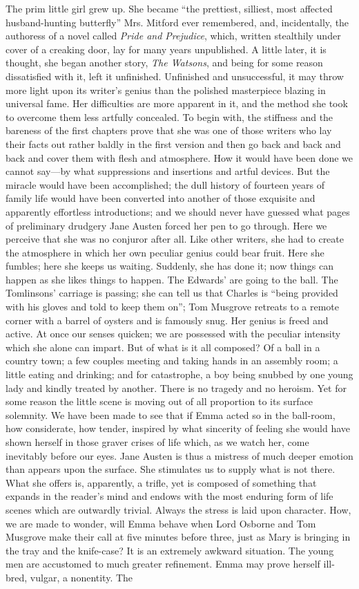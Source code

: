 The prim little girl grew up. She became ``the prettiest, silliest, most affected husband-hunting butterfly'' Mrs. Mitford ever remembered, and, incidentally, the authoress of a novel called \textit{Pride and Prejudice}, which, written stealthily under cover of a creaking door, lay for many years unpublished. A little later, it is thought, she began another story, \textit{The Watsons}, and being for some reason dissatisfied with it, left it unfinished. Unfinished and unsuccessful, it may throw more light upon its writer's genius than the polished masterpiece blazing in universal fame. Her difficulties are more apparent in it, and the method she took to overcome them less artfully concealed. To begin with, the stiffness and the bareness of the first chapters prove that she was one of those writers who lay their facts out rather baldly in the first version and then go back and back and back and cover them with flesh and atmosphere. How it would have been done we cannot say—by what suppressions and insertions and artful devices. But the miracle would have been accomplished; the dull history of fourteen years of family life would have been converted into another of those exquisite and apparently effortless introductions; and we should never have guessed what pages of preliminary drudgery Jane Austen forced her pen to go through. Here we perceive that she was no conjuror after all. Like other writers, she had to create the atmosphere in which her own peculiar genius could bear fruit. Here she fumbles; here she keeps us waiting. Suddenly, she has done it; now things can happen as she likes things to happen. The Edwards' are going to the ball. The Tomlinsons' carriage is passing; she can tell us that Charles is ``being provided with his gloves and told to keep them on''; Tom Musgrove retreats to a remote corner with a barrel of oysters and is famously snug. Her genius is freed and active. At once our senses quicken; we are possessed with the peculiar intensity which she alone can impart. But of what is it all composed? Of a ball in a country town; a few couples meeting and taking hands in an assembly room; a little eating and drinking; and for catastrophe, a boy being snubbed by one young lady and kindly treated by another. There is no tragedy and no heroism. Yet for some reason the little scene is moving out of all proportion to its surface solemnity. We have been made to see that if Emma acted so in the ball-room, how considerate, how tender, inspired by what sincerity of feeling she would have shown herself in those graver crises of life which, as we watch her, come inevitably before our eyes. Jane Austen is thus a mistress of much deeper emotion than appears upon the surface. She stimulates us to supply what is not there. What she offers is, apparently, a trifle, yet is composed of something that expands in the reader's mind and endows with the most enduring form of life scenes which are outwardly trivial. Always the stress is laid upon character. How, we are made to wonder, will Emma behave when Lord Osborne and Tom Musgrove make their call at five minutes before three, just as Mary is bringing in the tray and the knife-case? It is an extremely awkward situation. The young men are accustomed to much greater refinement. Emma may prove herself ill-bred, vulgar, a nonentity. The 